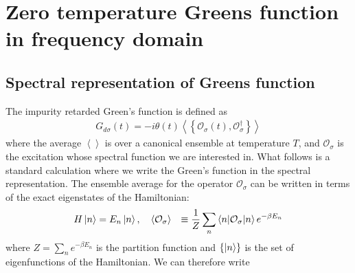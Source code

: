 \section{Zero temperature Greens function in frequency domain}

\label{appx-spectral-func}

\subsection{Spectral representation of Greens function}
The impurity retarded Green's function is defined as
\begin{equation}\begin{aligned}
	G_{d\sigma}(t) = -i\theta(t) \left<\left\{ \mathcal{O}_{\sigma}(t),\mathcal{O}^\dagger_{\sigma} \right\}  \right>
\end{aligned}\end{equation}
where the average \(\left< \right>\) is over a canonical ensemble at temperature \(T\), and \(\mathcal{O}_\sigma\) is the excitation whose spectral function we are interested in. What follows is a standard calculation where we write the Green's function in the spectral representation. The ensemble average for the operator \(\mathcal{O}_\sigma\) can be written in terms of the exact eigenstates of the Hamiltonian:
\begin{equation}\begin{aligned}
	H \ket{n} &= E_n \ket{n}, \quad\left<\mathcal{O}_\sigma\right> &\equiv \frac{1}{Z}\sum_n \braket{n | \mathcal{O}_\sigma | n} e^{-\beta E_n}
\end{aligned}\end{equation}
where \(Z = \sum_n e^{-\beta E_n}\) is the partition function and \(\left\{ \ket{n} \right\} \) is the set of eigenfunctions of the Hamiltonian. We can therefore write
